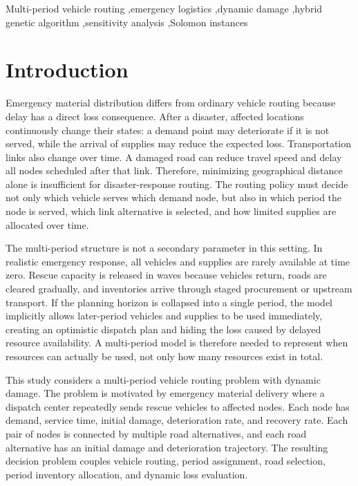 ﻿\documentclass[preprint,12pt,authoryear]{elsarticle}
\begin{document}
\begin{frontmatter}
\begin{keyword}
Multi-period vehicle routing \sep emergency logistics \sep dynamic damage \sep hybrid genetic algorithm \sep sensitivity analysis \sep Solomon instances
\end{keyword}

\end{frontmatter}

\section{Introduction}
\label{sec:introduction}

Emergency material distribution differs from ordinary vehicle routing because delay has a direct loss consequence. After a disaster, affected locations continuously change their states: a demand point may deteriorate if it is not served, while the arrival of supplies may reduce the expected loss. Transportation links also change over time. A damaged road can reduce travel speed and delay all nodes scheduled after that link. Therefore, minimizing geographical distance alone is insufficient for disaster-response routing. The routing policy must decide not only which vehicle serves which demand node, but also in which period the node is served, which link alternative is selected, and how limited supplies are allocated over time.

The multi-period structure is not a secondary parameter in this setting. In realistic emergency response, all vehicles and supplies are rarely available at time zero. Rescue capacity is released in waves because vehicles return, roads are cleared gradually, and inventories arrive through staged procurement or upstream transport. If the planning horizon is collapsed into a single period, the model implicitly allows later-period vehicles and supplies to be used immediately, creating an optimistic dispatch plan and hiding the loss caused by delayed resource availability. A multi-period model is therefore needed to represent when resources can actually be used, not only how many resources exist in total.

This study considers a multi-period vehicle routing problem with dynamic damage. The problem is motivated by emergency material delivery where a dispatch center repeatedly sends rescue vehicles to affected nodes. Each node has demand, service time, initial damage, deterioration rate, and recovery rate. Each pair of nodes is connected by multiple road alternatives, and each road alternative has an initial damage and deterioration trajectory. The resulting decision problem couples vehicle routing, period assignment, road selection, period inventory allocation, and dynamic loss evaluation.
\end{document}
